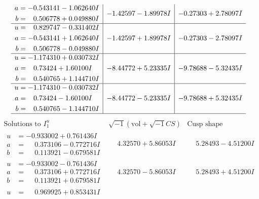 \documentclass[1p]{elsarticle_modified}
\theoremstyle{definition}
\newcommand{\I}{\sqrt{-1}}
\begin{document}
$$\begin{array}{c|c|c}
\begin{aligned}
a &= -0.543141 - 1.062640 I \\
b &= \phantom{-}0.506778 + 0.049880 I\end{aligned}
 & -1.42597 - 1.89978 I & -0.27303 + 2.78097 I \\ \hline\begin{aligned}
u &= \phantom{-}0.829747 - 0.331402 I \\
a &= -0.543141 + 1.062640 I \\
b &= \phantom{-}0.506778 - 0.049880 I\end{aligned}
 & -1.42597 + 1.89978 I & -0.27303 - 2.78097 I \\ \hline\begin{aligned}
u &= -1.174310 + 0.030732 I \\
a &= \phantom{-}0.73424 + 1.60100 I \\
b &= \phantom{-}0.540765 + 1.144710 I\end{aligned}
 & -8.44772 + 5.23335 I & -9.78688 - 5.32435 I \\ \hline\begin{aligned}
u &= -1.174310 - 0.030732 I \\
a &= \phantom{-}0.73424 - 1.60100 I \\
b &= \phantom{-}0.540765 - 1.144710 I\end{aligned}
 & -8.44772 - 5.23335 I & -9.78688 + 5.32435 I\\
 \hline 
 \end{array}$$\newpage$$\begin{array}{c|c|c}  
\text{Solutions to }I^u_{1}& \I (\text{vol} + \sqrt{-1}CS) & \text{Cusp shape}\\
 \hline 
\begin{aligned}
u &= -0.933002 + 0.761436 I \\
a &= \phantom{-}0.373106 - 0.772716 I \\
b &= \phantom{-}0.113921 - 0.679581 I\end{aligned}
 & \phantom{-}4.32570 + 5.86053 I & \phantom{-}5.28493 - 4.51200 I \\ \hline\begin{aligned}
u &= -0.933002 - 0.761436 I \\
a &= \phantom{-}0.373106 + 0.772716 I \\
b &= \phantom{-}0.113921 + 0.679581 I\end{aligned}
 & \phantom{-}4.32570 - 5.86053 I & \phantom{-}5.28493 + 4.51200 I \\ \hline\begin{aligned}
u &= \phantom{-}0.969925 + 0.853431 I \\

\end{aligned}
\end{array}$$
\end{document}
